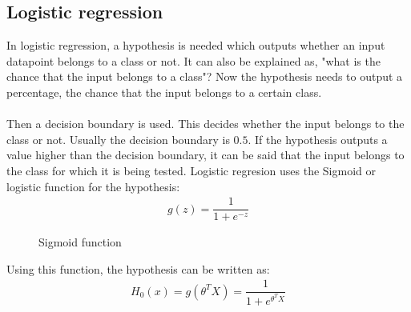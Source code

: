 \subsection{Logistic regression}
In logistic regression, a hypothesis is needed which outputs whether an input datapoint belongs to a class or not. It can also be explained as, "what is the chance that the input belongs to a class"? Now the hypothesis needs to output a percentage, the chance that the input belongs to a certain class. \\\\
Then a decision boundary is used. This decides whether the input belongs to the class or not. Usually the decision boundary is $0.5$. If the hypothesis outputs a value higher than the decision boundary, it can be said that the input belongs to the class for which it is being tested. Logistic regresion uses the Sigmoid or logistic function for the hypothesis:
\begin{align}
g(z) =  \dfrac{1}{1 + e^{-z}}
\end{align}
\begin{figure}[H]
\centering
{}
\caption{Sigmoid function} \label{fig:logregression}
\end{figure}
\noindent Using this function, the hypothesis can be written as:
\begin{align}
H_0(x) = g(\theta^TX) = \dfrac{1}{1 + e^{\theta^TX}}
\end{align}
